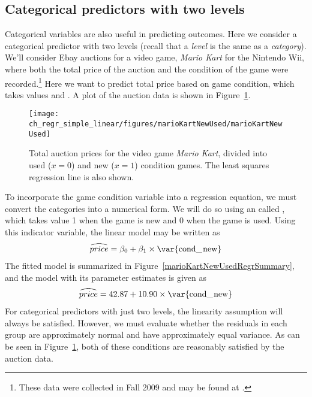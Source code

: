

\subsection{Categorical predictors with two levels}
\label{categoricalPredictorsWithTwoLevels}

Categorical variables are also useful in predicting outcomes. Here we consider a categorical predictor with two levels (recall that a \emph{level} is the same as a \emph{category}). We'll consider Ebay auctions for a video game, \emph{Mario Kart} for the Nintendo Wii, where both the total price of the auction and the condition of the game were recorded.\footnote{These data were collected in Fall 2009 and may be found at .} Here we want to predict total price based on game condition, which takes values  and . A plot of the auction data is shown in Figure~\ref{marioKartNewUsed}.

\begin{figure}[h]
\centering
\texttt{[image: ch\_regr\_simple\_linear/figures/marioKartNewUsed/marioKartNewUsed]}
\caption{Total auction prices for the video game \emph{Mario Kart}, divided into used ($x=0$) and new ($x=1$) condition games. The least squares regression line is also shown.}
\label{marioKartNewUsed}
\end{figure}

To incorporate the game condition variable into a regression equation, we must convert the categories into a numerical form. We will do so using an  called , which takes value 1 when the game is new and 0 when the game is used. Using this indicator variable, the linear model may be written as
\begin{align*}
\widehat{price} = \beta_0 + \beta_1 \times \text{\var{cond\_\hspace{0.3mm}new}}
\end{align*}
The fitted model is summarized in Figure~\ref{marioKartNewUsedRegrSummary}, and the model with its parameter estimates is given as
\begin{align*}
\widehat{price} = 42.87 + 10.90 \times \text{\var{cond\_\hspace{0.3mm}new}}
\end{align*}
For categorical predictors with just two levels, the linearity assumption will always be satisfied. However, we must evaluate whether the residuals in each group are approximately normal and have approximately equal variance. As can be seen in Figure~\ref{marioKartNewUsed}, both of these conditions are reasonably satisfied by the auction data.

